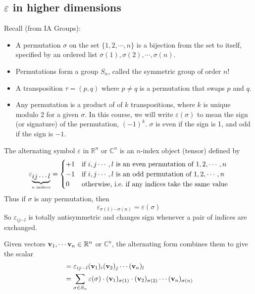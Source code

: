 \subsection{\(\varepsilon\) in higher dimensions}
Recall (from IA Groups):
\begin{itemize}
	\item A permutation \(\sigma\) on the set \(\{ 1, 2, \cdots, n \}\) is a bijection from the set to itself, specified by an ordered list \(\sigma(1), \sigma(2), \cdots, \sigma(n)\).
	\item Permutations form a group \(S_n\), called the symmetric group of order \(n!
	      \)
	\item A transposition \(\tau = (p, q)\) where \(p \neq q\) is a permutation that swaps \(p\) and \(q\).
	\item Any permutation is a product of of \(k\) transpositions, where \(k\) is unique modulo 2 for a given \(\sigma\).
	      In this course, we will write \(\varepsilon(\sigma)\) to mean the sign (or signature) of the permutation, \((-1)^k\).
	      \(\sigma\) is even if the sign is 1, and odd if the sign is \(-1\).
\end{itemize}
The alternating symbol \(\varepsilon\) in \(\mathbb R^n\) or \(\mathbb C^n\) is an \(n\)-index object (tensor) defined by
\[
	\varepsilon_{\underbrace{ij\cdots l}_{\mathclap{n \text{ indices}}}} = \begin{cases}
		+1 & \text{if } i, j \cdots, l \text{ is an even permutation of } 1, 2, \cdots, n \\
		-1 & \text{if } i, j \cdots, l \text{ is an odd permutation of } 1, 2, \cdots, n  \\
		0  & \text{otherwise, i.e.\ if any indices take the same value}
	\end{cases}
\]
Thus if \(\sigma\) is any permutation, then
\[
	\varepsilon_{\sigma(1)\cdots\sigma(n)} = \varepsilon(\sigma)
\]
So \(\varepsilon_{ij\cdots l}\) is totally antisymmetric and changes sign whenever a pair of indices are exchanged.
\begin{definition}
	Given vectors \(\vb v_1, \cdots \vb v_n \in \mathbb R^n\) or \(\mathbb C^n\), the alternating form combines them to give the scalar
	\begin{align*}
		[\vb v_1, \vb v_2, \cdots, \vb v_n ] & = \varepsilon_{ij\cdots l} (\vb v_1)_i (\vb v_2)_j \cdots (\vb v_n)_l                                                            \\
		                                     & = \sum_{\sigma \in S_n} \varepsilon(\sigma) \cdot (\vb v_1)_{\sigma(1)} \cdot (\vb v_2)_{\sigma(2)} \cdots (\vb v_n)_{\sigma(n)}
	\end{align*}
\end{definition}

